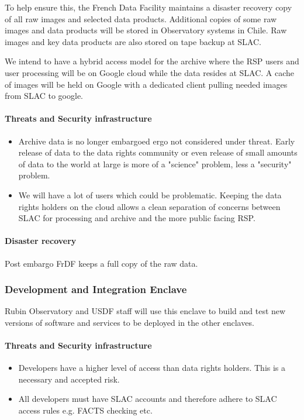 To help ensure this, the French Data Facility maintains a disaster recovery copy of all raw images and selected data products. Additional copies of some raw images and data products will be stored in Observatory systems in Chile.  Raw images and key data products are also stored on tape backup at \gls{SLAC}.

We intend to have a hybrid access model for the archive where  the \gls{RSP} users and user processing will be on Google \gls{cloud} while the data resides at SLAC. A cache of images will be held on Google with a dedicated client pulling needed images from SLAC to google.


\paragraph{ Threats and Security infrastructure}

\begin{itemize}
\item \gls{Archive} data is no longer embargoed ergo not considered under threat.  Early release of data to the data rights community or even release of small amounts of data to the world at large is more of a "science" problem, less a "security" problem.
\item We will have a lot of users which could be problematic. Keeping the data rights holders on the \gls{cloud} allows a clean separation of concerns between SLAC for processing and archive and the more public facing \gls{RSP}.
\end{itemize}
\paragraph{Disaster recovery}
Post embargo \gls{FrDF} keeps a full copy of the raw data.


\subsubsection{Development and Integration  \gls{Enclave}}
Rubin Observatory and \gls{USDF} staff will use this enclave to build and test new versions of \gls{software} and services to be deployed in the other enclaves.

\paragraph{Threats and Security infrastructure}

\begin{itemize}
\item Developers have a higher level of access than data rights holders.
This is a necessary and accepted risk.
\item All developers must have SLAC accounts and therefore adhere to SLAC access rules e.g. \gls{FACTS} checking etc.
\end{itemize}

